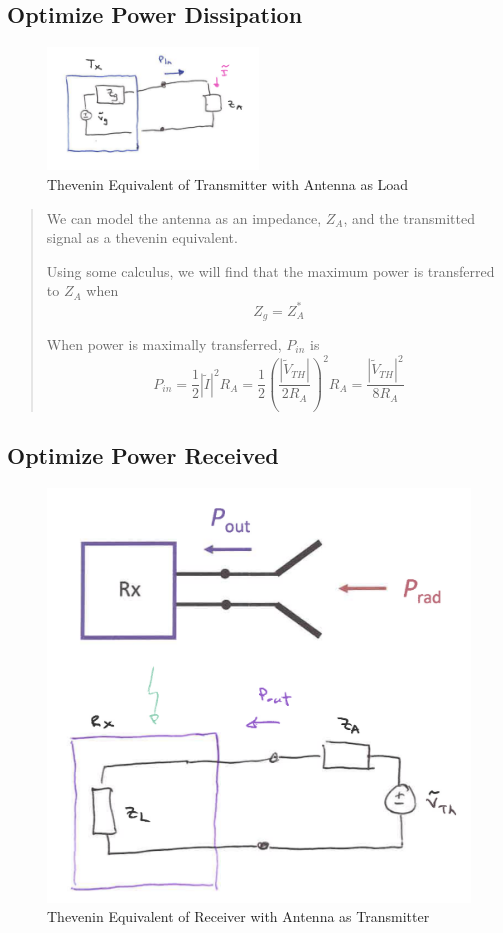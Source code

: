 \documentclass{article} %
\begin{document}
\subsection{Optimize Power Dissipation}

\begin{figure}[H]
    \centering
    \includegraphics[width=0.5\textwidth]{./image/figure5.png}
    \caption{Thevenin Equivalent of Transmitter with Antenna as Load}
\end{figure}
\begin{quote}
    We can model the antenna as an impedance, $Z_A$, and the transmitted signal as a thevenin equivalent.

    Using some calculus, we will find that the maximum power is transferred to $Z_A$ when
    \[Z_g = Z_A^*\]

    When power is maximally transferred, $P_{in}$ is
    \[P_{in} = \frac{1}{2}|\tilde{I}|^2 R_A = \frac{1}{2}\left(\frac{|\tilde{V}_{TH}|}{2R_A}\right)^2R_A = \frac{|\tilde{V}_{TH}|^2}{8R_A}\]
\end{quote}

\subsection{Optimize Power Received}

\begin{figure}[H]
    \centering
    \includegraphics[width=1\textwidth]{./image/figure6.png}
    \caption{Thevenin Equivalent of Receiver with Antenna as Transmitter}
\end{figure}
\end{document}
